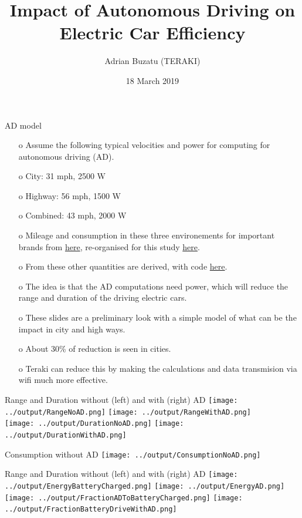 \documentclass{beamer}
\title[AD impact on electric car efficiency]{Impact of Autonomous Driving on Electric Car Efficiency}
\author[Adrian Buzatu (TERAKI) ]{Adrian Buzatu (TERAKI)}
\date{18 March 2019}
\begin{document}

\frame{\titlepage} 
\def \AdrianSize {0.45}
\def \AdrianSizeOne {0.95}



\begin{frame}{AD model}
\begin{enumerate}
\item[o] Assume the following typical velocities and power for computing for autonomous driving (AD).
\item[o] City: 31 mph, 2500 W
\item[o] Highway: 56 mph, 1500 W
\item[o] Combined: 43 mph, 2000 W
\item[o] Mileage and consumption in these three environements for important brands from \href{https://pushevs.com/electric-car-range-efficiency-epa/}{here}, re-organised for this study \href{https://gitlab.cern.ch/abuzatu/BuzatuPython/blob/master/examples/teraki/electricCarEfficiency/input/data.txt}{here}.
\item[o] From these other quantities are derived, with code \href{https://gitlab.cern.ch/abuzatu/BuzatuPython/blob/master/examples/teraki/electricCarEfficiency/electricCarEfficiency.py}{here}.
\item[o] The idea is that the AD computations need power, which will reduce the range and duration of the driving electric cars.
\item[o] These slides are a preliminary look with a simple model of what can be the impact in city and high ways.
\item[o] About 30\% of reduction is seen in cities. 
\item[o] Teraki can reduce this by making the calculations and data transmision via wifi much more effective.
\end{enumerate}
\end{frame}

\begin{frame}{Range and Duration without (left) and with (right) AD}
\centering
\texttt{[image: ../output/RangeNoAD.png]}
\texttt{[image: ../output/RangeWithAD.png]}\\
\texttt{[image: ../output/DurationNoAD.png]}
\texttt{[image: ../output/DurationWithAD.png]}\\
\end{frame}

\begin{frame}{Consumption without AD}
\centering
\texttt{[image: ../output/ConsumptionNoAD.png]}
\end{frame}

\begin{frame}{Range and Duration without (left) and with (right) AD}
\centering
\texttt{[image: ../output/EnergyBatteryCharged.png]}
\texttt{[image: ../output/EnergyAD.png]}\\
\texttt{[image: ../output/FractionADToBatteryCharged.png]}
\texttt{[image: ../output/FractionBatteryDriveWithAD.png]}\\
\end{frame}
\end{document}
